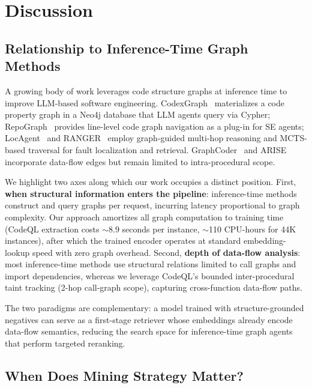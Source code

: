 \section{Discussion}
\label{sec:discussion}

\subsection{Relationship to Inference-Time Graph Methods}
\label{sec:discuss-inference}

A growing body of work leverages code structure graphs at inference time to improve LLM-based software engineering.
CodexGraph~\cite{liu2025codexgraph} materializes a code property graph in a Neo4j database that LLM agents query via Cypher; RepoGraph~\cite{ouyang2025repograph} provides line-level code graph navigation as a plug-in for SE agents; LocAgent~\cite{chen2025locagent} and RANGER~\cite{shah2025ranger} employ graph-guided multi-hop reasoning and MCTS-based traversal for fault localization and retrieval.
GraphCoder~\cite{liu2024graphcoder} and ARISE~\cite{seddik2026arise} incorporate data-flow edges but remain limited to intra-procedural scope.

We highlight two axes along which our work occupies a distinct position.
First, \textbf{when structural information enters the pipeline}: inference-time methods construct and query graphs per request, incurring latency proportional to graph complexity.
Our approach amortizes all graph computation to training time (CodeQL extraction costs $\sim$8.9 seconds per instance, $\sim$110 CPU-hours for 44K instances), after which the trained encoder operates at standard embedding-lookup speed with zero graph overhead.
Second, \textbf{depth of data-flow analysis}: most inference-time methods use structural relations limited to call graphs and import dependencies, whereas we leverage CodeQL's bounded inter-procedural taint tracking (2-hop call-graph scope), capturing cross-function data-flow paths.

The two paradigms are complementary: a model trained with structure-grounded negatives can serve as a first-stage retriever whose embeddings already encode data-flow semantics, reducing the search space for inference-time graph agents that perform targeted reranking.

\subsection{When Does Mining Strategy Matter?}
\label{sec:discuss-when}

